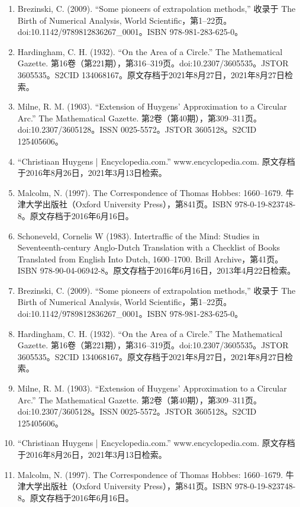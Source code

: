 \begin{enumerate}
\item Brezinski, C. (2009). “Some pioneers of extrapolation methods,” 收录于 The Birth of Numerical Analysis, World Scientific，第1–22页。doi:10.1142/9789812836267_0001。ISBN 978-981-283-625-0。
\item Hardingham, C. H. (1932). “On the Area of a Circle.” The Mathematical Gazette. 第16卷（第221期），第316–319页。doi:10.2307/3605535。JSTOR 3605535。S2CID 134068167。原文存档于2021年8月27日，2021年8月27日检索。
\item Milne, R. M. (1903). “Extension of Huygens’ Approximation to a Circular Arc.” The Mathematical Gazette. 第2卷（第40期），第309–311页。doi:10.2307/3605128。ISSN 0025-5572。JSTOR 3605128。S2CID 125405606。
\item “Christiaan Huygens | Encyclopedia.com.” www.encyclopedia.com. 原文存档于2016年8月26日，2021年3月13日检索。
\item Malcolm, N. (1997). The Correspondence of Thomas Hobbes: 1660–1679. 牛津大学出版社（Oxford University Press），第841页。ISBN 978-0-19-823748-8。原文存档于2016年6月16日。
\item Schoneveld, Cornelis W (1983). Intertraffic of the Mind: Studies in Seventeenth-century Anglo-Dutch Translation with a Checklist of Books Translated from English Into Dutch, 1600–1700. Brill Archive，第41页。ISBN 978-90-04-06942-8。原文存档于2016年6月16日，2013年4月22日检索。
\item Brezinski, C. (2009). “Some pioneers of extrapolation methods,” 收录于 The Birth of Numerical Analysis, World Scientific，第1–22页。doi:10.1142/9789812836267_0001。ISBN 978-981-283-625-0。
\item Hardingham, C. H. (1932). “On the Area of a Circle.” The Mathematical Gazette. 第16卷（第221期），第316–319页。doi:10.2307/3605535。JSTOR 3605535。S2CID 134068167。原文存档于2021年8月27日，2021年8月27日检索。
\item Milne, R. M. (1903). “Extension of Huygens’ Approximation to a Circular Arc.” The Mathematical Gazette. 第2卷（第40期），第309–311页。doi:10.2307/3605128。ISSN 0025-5572。JSTOR 3605128。S2CID 125405606。
\item “Christiaan Huygens | Encyclopedia.com.” www.encyclopedia.com. 原文存档于2016年8月26日，2021年3月13日检索。
\item Malcolm, N. (1997). The Correspondence of Thomas Hobbes: 1660–1679. 牛津大学出版社（Oxford University Press），第841页。ISBN 978-0-19-823748-8。原文存档于2016年6月16日。



\end{enumerate}


